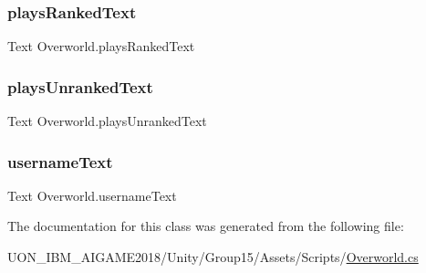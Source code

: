 \subsubsection{\texorpdfstring{playsRankedText}{playsRankedText}}
{\footnotesize\ttfamily Text Overworld.\+plays\+Ranked\+Text\hspace{0.3cm}{\ttfamily [private]}}

\mbox{\label{class_overworld_acc8ed451f9c538a45f30306c09ce25e4}} 
\subsubsection{\texorpdfstring{playsUnrankedText}{playsUnrankedText}}
{\footnotesize\ttfamily Text Overworld.\+plays\+Unranked\+Text\hspace{0.3cm}{\ttfamily [private]}}

\mbox{\label{class_overworld_ad316e6335a332e6bedcc7bd77b39bd93}} 
\subsubsection{\texorpdfstring{usernameText}{usernameText}}
{\footnotesize\ttfamily Text Overworld.\+username\+Text}



The documentation for this class was generated from the following file\+:\begin{DoxyCompactItemize}
\item 
U\+O\+N\+\_\+\+I\+B\+M\+\_\+\+A\+I\+G\+A\+M\+E2018/\+Unity/\+Group15/\+Assets/\+Scripts/\mbox{\hyperlink{_overworld_8cs}{Overworld.\+cs}}\end{DoxyCompactItemize}

